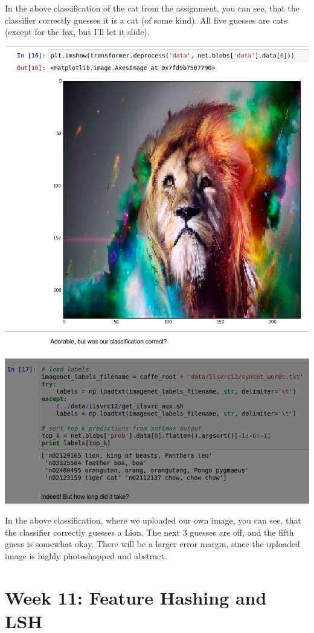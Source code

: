\documentclass{article}
\begin{document}
In the above classification of the cat from the assignment, you can see, that the classifier correctly guesses it is a cat (of some kind). All five guesses are cats (except for the fox, but I'll let it slide).

\includegraphics[scale=0.5]{lion1.png}

\includegraphics[scale=0.5]{lion2.png}

In the above classification, where we uploaded our own image, you can see, that the classifier correctly guesses a Lion. The next 3 guesses are off, and the fifth guess is somewhat okay. There will be a larger error margin, since the uploaded image is highly photoshopped and abstract.


\section{Week 11: Feature Hashing and LSH}
\end{document}
